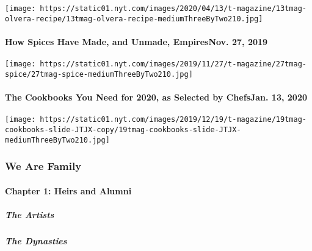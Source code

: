 \texttt{[image: https://static01.nyt.com/images/2020/04/13/t-magazine/13tmag-olvera-recipe/13tmag-olvera-recipe-mediumThreeByTwo210.jpg]}
\href{https://www.nytimes.com/2019/11/27/t-magazine/spices.html}{}

\hypertarget{how-spices-have-made-and-unmade-empiresnov-27-2019}{%
\paragraph{How Spices Have Made, and Unmade, EmpiresNov. 27,
2019}\label{how-spices-have-made-and-unmade-empiresnov-27-2019}}

\texttt{[image: https://static01.nyt.com/images/2019/11/27/t-magazine/27tmag-spice/27tmag-spice-mediumThreeByTwo210.jpg]}
\href{https://www.nytimes.com/2020/01/13/t-magazine/best-chef-cook-books.html}{}

\hypertarget{the-cookbooks-you-need-for-2020-as-selected-by-chefsjan-13-2020}{%
\paragraph{The Cookbooks You Need for 2020, as Selected by ChefsJan. 13,
2020}\label{the-cookbooks-you-need-for-2020-as-selected-by-chefsjan-13-2020}}

\texttt{[image: https://static01.nyt.com/images/2019/12/19/t-magazine/19tmag-cookbooks-slide-JTJX-copy/19tmag-cookbooks-slide-JTJX-mediumThreeByTwo210.jpg]}

\hypertarget{we-are-family-1}{%
\subsubsection{We Are Family}\label{we-are-family-1}}

\hypertarget{chapter-1-heirs-and-alumni-1}{%
\paragraph{Chapter 1: Heirs and
Alumni}\label{chapter-1-heirs-and-alumni-1}}

\href{/interactive/2020/04/13/t-magazine/black-art-galleries.html}{}

\hypertarget{the-artists}{%
\subparagraph{The Artists}\label{the-artists}}

\href{/interactive/2020/04/13/t-magazine/italian-fashion-design-houses.html}{}

\hypertarget{the-dynasties}{%
\subparagraph{The Dynasties}\label{the-dynasties}}

\href{/interactive/2020/04/13/t-magazine/gordon-parks.html}{}

